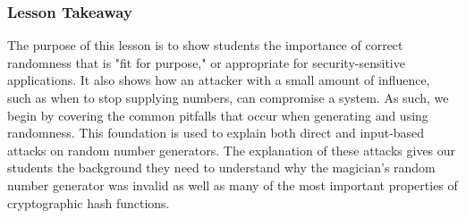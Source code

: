 %

\subsubsection{Lesson Takeaway}

The purpose of this lesson is to show students the importance of correct
randomness
that is "fit for purpose," or appropriate for security-sensitive applications.
It also shows how an attacker
with a small amount of influence,
such as when to stop supplying numbers,
can compromise a
system.
As such, we begin by covering the common pitfalls
that occur when generating and
using randomness.
This foundation is used to explain both
direct and input-based attacks on random
number generators.
The explanation of these attacks gives our students the background they need to
understand why the magician's random number generator was invalid as well as
many of the most important properties of cryptographic hash functions.


